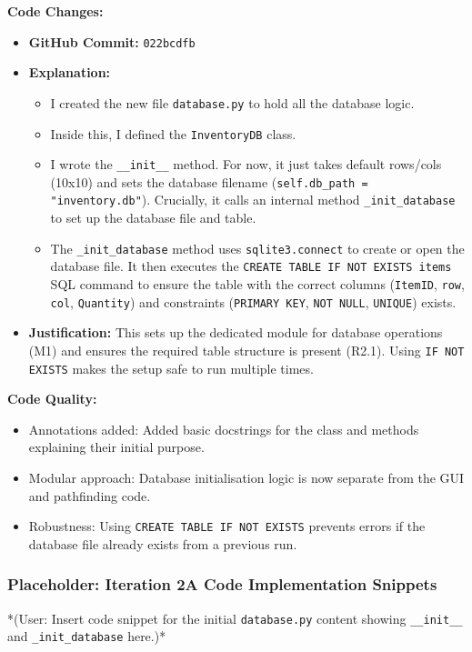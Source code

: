 \textbf{Code Changes:}
\begin{itemize}
	\item \textbf{GitHub Commit:} \verb|022bcdfb|
	\item \textbf{Explanation:}
	\begin{itemize}
		\item I created the new file \verb|database.py| to hold all the database logic.
		\item Inside this, I defined the \verb|InventoryDB| class.
		\item I wrote the \verb|__init__| method. For now, it just takes default rows/cols (10x10) and sets the database filename (\verb|self.db_path = "inventory.db"|). Crucially, it calls an internal method \verb|_init_database| to set up the database file and table.
		\item The \verb|_init_database| method uses \verb|sqlite3.connect| to create or open the database file. It then executes the \verb|CREATE TABLE IF NOT EXISTS items| SQL command to ensure the table with the correct columns (\verb|ItemID|, \verb|row|, \verb|col|, \verb|Quantity|) and constraints (\verb|PRIMARY KEY|, \verb|NOT NULL|, \verb|UNIQUE|) exists.
	\end{itemize}
	\item \textbf{Justification:} This sets up the dedicated module for database operations (M1) and ensures the required table structure is present (R2.1). Using \verb|IF NOT EXISTS| makes the setup safe to run multiple times.
\end{itemize}

\textbf{Code Quality:}
\begin{itemize}
	\item Annotations added: Added basic docstrings for the class and methods explaining their initial purpose.
	\item Modular approach: Database initialisation logic is now separate from the GUI and pathfinding code.
	\item Robustness: Using \verb|CREATE TABLE IF NOT EXISTS| prevents errors if the database file already exists from a previous run.
\end{itemize}

\newpage
\subsubsection*{Placeholder: Iteration 2A Code Implementation Snippets}
*(User: Insert code snippet for the initial \verb|database.py| content showing \verb|__init__| and \verb|_init_database| here.)*
\newpage

